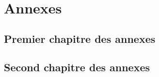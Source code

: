 \documentclass[english]{spimubphdthesis}
\begin{document}
 
\backmatter
 
 
 
 
 
 
 
 
 

%
 

 
 
\listoffigures
 
\listoftables
 
\listofdefinitions

\appendix
\part{Annexes}
 
\chapter{Premier chapitre des annexes}

\chapter{Second chapitre des annexes}
 
\end{document}
